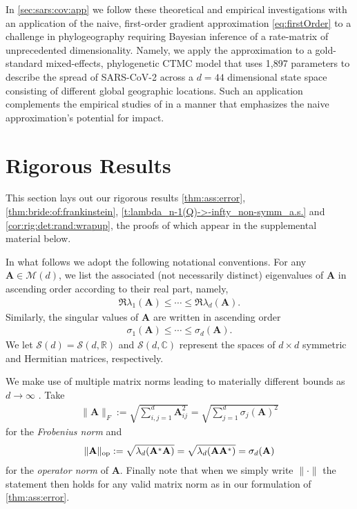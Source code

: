 \documentclass[9pt,twocolumn,twoside]{pnas-new}
\newcommand{\bbR}{{\mathbb R}}
\newcommand{\bbC}{{\mathbb C}}
\newcommand{\?}{\textbf{?}}
\begin{document}
In \cref{sec:sars:cov:app} we follow these theoretical and empirical investigations
with an application of the naive, first-order gradient approximation
\eqref{eq:firstOrder} to a challenge in phylogeography requiring
Bayesian inference of a rate-matrix of unprecedented dimensionality.
Namely, we apply the approximation to a gold-standard mixed-effects,
phylogenetic CTMC model that uses 1,897 parameters to describe the
spread of SARS-CoV-2 across a $d=44$ dimensional state space
consisting of different global geographic locations.  Such an
application complements the empirical studies of
\cite{magee2023random} in a manner that emphasizes the naive
approximation's potential for impact.





\section{Rigorous Results}
\label{sec:rig:results}

This section lays out our rigorous results \cref{thm:ass:error},
\cref{thm:bride:of:frankinstein},
\cref{t:lambda_n-1(Q)->-infty_non-symm_a.s.} and
\cref{cor:rig:det:rand:wrapup}, the proofs of which appear in the
supplemental material below.

In what follows we adopt the following notational conventions. For any
${\mathbf A} \in {\mathcal M}(d)$, we list the associated (not
necessarily distinct) eigenvalues of $\mathbf{A}$ in ascending order
according to their real part, namely,
\begin{align}\label{eq:EV:real:ass}
  \Re \lambda_1({\mathbf A}) \leq \cdots \leq \Re \lambda_d({\mathbf A}).
\end{align}
Similarly, the singular values of ${\mathbf A}$ are written in
ascending order
\begin{align}\label{eq:SV:ass}
  \sigma_1({\mathbf A}) \leq \cdots \leq \sigma_d({\mathbf A}).
\end{align}
We let ${\mathcal S}(d) = {\mathcal S}(d,\bbR)$ and ${\mathcal S}(d,\bbC)$ represent the spaces of $d \times d$ symmetric and Hermitian matrices,
respectively.

We make use of multiple matrix norms leading to
materially different bounds as $d \rightarrow \infty$ \cite{trefethen2022numerical}.  Take
\begin{align}\label{eq:frob:norm}
  \|\mathbf{A}\|_{F} := \sqrt{\sum_{i,j =1}^d \mathbf{A}_{ij}^2} =
  \sqrt{\sum_{j =1}^d \sigma_j(\mathbf{A})^2}
\end{align}
for the \emph{Frobenius norm} and
\begin{align}\label{eq:op:norm}
  \|{\mathbf A}\|_{\textnormal{op}} :=  \sqrt{\lambda_d({\mathbf
  A}^*{\mathbf A})} = \sqrt{\lambda_d({\mathbf A}{\mathbf A}^*)}
  = \sigma_d(\mathbf{A})
\end{align}
for the \emph{operator norm} of ${\mathbf A}$.  Finally note that when we
simply write $\| \cdot \|$ the statement then holds for any valid
matrix norm as in our formulation of \cref{thm:ass:error}.
\end{document}
